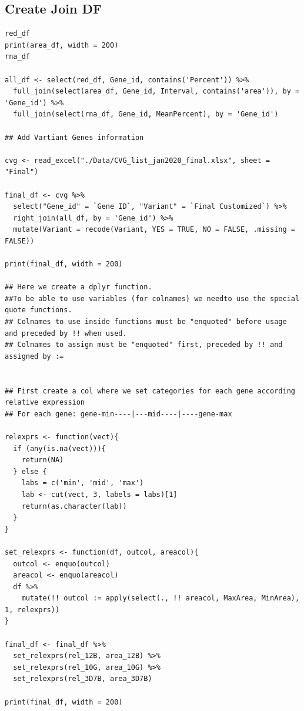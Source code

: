 \documentclass[11pt]{article}
\begin{document}
\subsection{Create Join DF}
\label{sec:orgf5a24b2}
\begin{verbatim}
red_df
print(area_df, width = 200)
rna_df

all_df <- select(red_df, Gene_id, contains('Percent')) %>%
  full_join(select(area_df, Gene_id, Interval, contains('area')), by = 'Gene_id') %>%
  full_join(select(rna_df, Gene_id, MeanPercent), by = 'Gene_id')

## Add Vartiant Genes information

cvg <- read_excel("./Data/CVG_list_jan2020_final.xlsx", sheet = "Final")

final_df <- cvg %>%
  select("Gene_id" = `Gene ID`, "Variant" = `Final Customized`) %>%
  right_join(all_df, by = 'Gene_id') %>%
  mutate(Variant = recode(Variant, YES = TRUE, NO = FALSE, .missing = FALSE))

print(final_df, width = 200)

## Here we create a dplyr function.
##To be able to use variables (for colnames) we needto use the special quote functions.
## Colnames to use inside functions must be "enquoted" before usage and preceded by !! when used.
## Colnames to assign must be "enquoted" first, preceded by !! and assigned by :=


## First create a col where we set categories for each gene according relative expression
## For each gene: gene-min----|---mid----|----gene-max

relexprs <- function(vect){
  if (any(is.na(vect))){
    return(NA)
  } else {
    labs = c('min', 'mid', 'max')
    lab <- cut(vect, 3, labels = labs)[1]
    return(as.character(lab))
  }
}

set_relexprs <- function(df, outcol, areacol){
  outcol <- enquo(outcol)
  areacol <- enquo(areacol)
  df %>%
    mutate(!! outcol := apply(select(., !! areacol, MaxArea, MinArea), 1, relexprs))
}

final_df <- final_df %>%
  set_relexprs(rel_12B, area_12B) %>%
  set_relexprs(rel_10G, area_10G) %>%
  set_relexprs(rel_3D7B, area_3D7B)

print(final_df, width = 200)
\end{verbatim}
\end{document}
